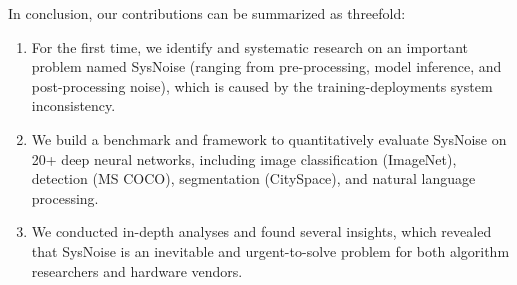 In conclusion, our contributions can be summarized as threefold:
\begin{enumerate}[nosep, leftmargin=*]
\item For the first time, we identify and systematic research on an important problem named SysNoise (ranging from pre-processing, model inference, and post-processing noise), which is caused by the training-deployments system inconsistency. %
\item We build a benchmark and framework to quantitatively evaluate SysNoise on 20+ deep neural networks, including image classification (ImageNet), detection (MS COCO), segmentation (CitySpace), and natural language processing. 

\item We conducted in-depth analyses and found several insights, which revealed that SysNoise is an inevitable and urgent-to-solve problem for both algorithm researchers and hardware vendors. 
\end{enumerate} 





